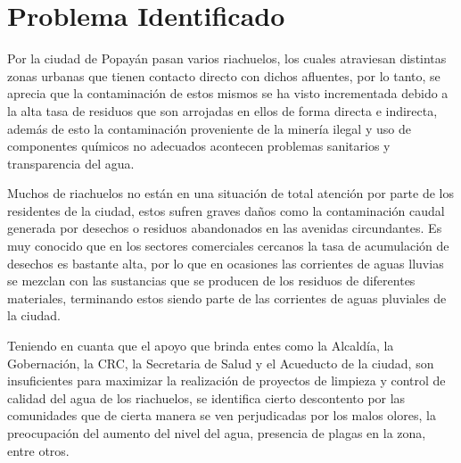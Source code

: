\section{Problema Identificado}
  Por la ciudad de Popayán pasan varios riachuelos, los cuales atraviesan distintas zonas urbanas que tienen contacto directo con dichos afluentes, por lo tanto, se aprecia que la contaminación de estos mismos se ha visto incrementada debido a la alta tasa de residuos que son arrojadas en ellos de forma directa e indirecta, además de esto la contaminación proveniente de la minería ilegal y uso de componentes químicos no adecuados acontecen problemas sanitarios y transparencia del agua.

  Muchos de riachuelos no están en una situación de total atención por parte de los residentes de la ciudad, estos sufren graves daños como la contaminación caudal generada por desechos o residuos abandonados en las avenidas circundantes. Es muy conocido que en los sectores comerciales cercanos la tasa de acumulación de desechos es bastante alta, por lo que en ocasiones las corrientes de aguas lluvias se mezclan con las sustancias que se producen de los residuos de diferentes materiales, terminando estos siendo parte de las corrientes de aguas pluviales de la ciudad.
  
  Teniendo en cuanta que el apoyo que brinda entes como la Alcaldía, la Gobernación, la CRC, la Secretaria de Salud y el Acueducto de la ciudad, son insuficientes para maximizar la realización de proyectos de limpieza y control de calidad del agua de los riachuelos, se identifica cierto descontento por las comunidades que de cierta manera se ven perjudicadas por los malos olores, la preocupación del aumento del nivel del agua, presencia de plagas en la zona, entre otros. 


